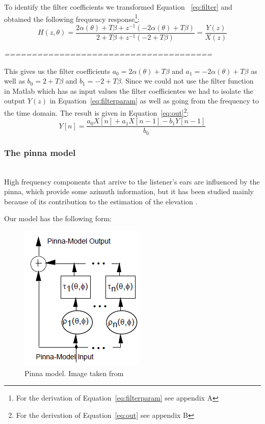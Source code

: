 \documentclass[journal]{IEEEtran}
\begin{document}
To identify the filter coefficients we transformed Equation ~\ref{eq:filter} and obtained the following frequency response\footnote{For the derivation of Equation~\ref{eq:filterparam} see appendix A}:
\begin{equation}\label{eq:filterparam}
H\left( z,\theta\right) = \frac{2\alpha (\theta)+T\beta+z^{-1}(-2\alpha(\theta)+T\beta)}{2+T\beta+z^{-1}(-2+T\beta)} = \frac{Y(z)}{X(z)}
\end{equation} 

\emph{======================================}

This gives us the filter coefficients $a_0 = 2\alpha (\theta)+T\beta$ and $a_1 = -2\alpha(\theta)+T\beta$ as well as $b_0 = 2+T\beta$ and $b_1 = -2+T\beta$. Since we could not use the filter function in Matlab which has as input values the filter coefficientes we had to isolate the output $Y(z)$ in Equation~\ref{eq:filterparam} as well as going from the frequency to the time domain. The result is given in Equation~\ref{eq:out}\footnote{For the derivation of Equation~\ref{eq:out} see appendix B}:
\begin{equation}\label{eq:out}
Y[n] =\frac{a_0X[n]+a_1X[n-1]-b_1Y[n-1]}{b_0}
\end{equation} 

\subsubsection{The pinna model}~\\

High frequency components that arrive to the listener's ears are influenced by the pinna, which provide some azimuth information, but it has been studied mainly because of its contribution to the estimation of the elevation \cite{BrownAndDuda}.

Our model has the following form:

\begin{figure}[h!]
	\centering
		\includegraphics[scale=0.75]{graphics/pinna_part.png}
	\caption{Pinna model. Image taken from \cite{Brown1997}}
	\label{fig:pinnaModel}
\end{figure}
\end{document}
